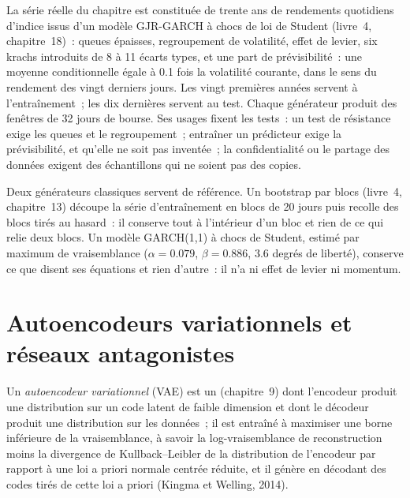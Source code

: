 La série réelle du chapitre est constituée de trente ans de rendements quotidiens d'indice issus d'un modèle GJR-GARCH à chocs de loi de Student (livre~4,
chapitre~18)~: queues épaisses, regroupement de volatilité, effet de levier, six krachs introduits de 8 à 11 écarts types,
et une part de prévisibilité~: une moyenne conditionnelle égale à 0.1 fois la volatilité courante, dans le sens du rendement des
vingt derniers jours. Les vingt premières années servent à l'entraînement~; les dix dernières servent au test. Chaque générateur produit des fenêtres de 32 jours de bourse. Ses
usages fixent les tests~: un test de résistance exige les queues et le regroupement~; entraîner un prédicteur exige la prévisibilité,
et qu'elle ne soit pas inventée~; la confidentialité ou le partage des données exigent des échantillons qui ne soient pas des copies.

Deux générateurs classiques servent de référence. Un bootstrap par blocs (livre~4, chapitre~13) découpe la série d'entraînement en blocs de 20 jours
puis recolle des blocs tirés au hasard~: il conserve tout à l'intérieur d'un bloc et rien de ce qui relie deux blocs. Un modèle GARCH(1,1)
à chocs de Student, estimé par maximum de vraisemblance ($\alpha = 0.079$, $\beta = 0.886$, 3.6 degrés de liberté), conserve
ce que disent ses équations et rien d'autre~: il n'a ni effet de levier ni momentum.

\section{Autoencodeurs variationnels et réseaux antagonistes}

\begin{definition}\label{def:ml:generative-models-and-synthetic-data:vae}
Un \emph{autoencodeur variationnel} (VAE) est un  (chapitre~9) dont l'encodeur produit une
distribution sur un code latent de faible dimension et dont le décodeur produit une distribution sur les données~; il est entraîné à
maximiser une borne inférieure de la vraisemblance, à savoir la log-vraisemblance de reconstruction moins la divergence de Kullback--Leibler
de la distribution de l'encodeur par rapport à une loi a priori normale centrée réduite, et il génère en décodant des codes tirés de cette loi a priori (Kingma et
Welling, 2014).
\end{definition}

